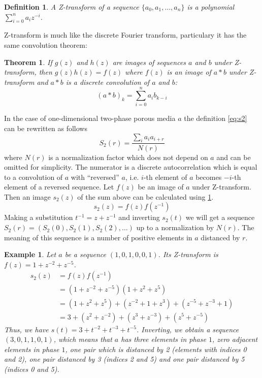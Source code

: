 \documentclass[12pt, a4paper]{article}
\newtheorem{definition}{Definition}
\newtheorem{example}{Example}
\newtheorem{theorem}{Theorem}
\begin{document}
\begin{definition}
  A Z-transform of a sequence $\{a_0, a_1, \dots, a_n\}$ is a polynomial
  $\sum_{i=0}^n a_i z^{-i}$.
\end{definition}
Z-transform is much like the discrete Fourier transform, particulary it has the
same convolution theorem:
\begin{theorem}
  If $g(z)$ and $h(z)$ are images of sequences $a$ and $b$ under Z-transform,
  then $g(z)h(z) = f(z)$ where $f(z)$ is an image of $a*b$ under Z-transform
  and $a*b$ is a discrete convolution of $a$ and $b$:
  \begin{equation*}
    (a*b)_k = \sum_{i=0}^{n} a_i b_{k-i}
  \end{equation*}
  \label{th:conv}
\end{theorem}
In the case of one-dimensional two-phase porous media $a$ the definition
\ref{eq:s2} can be rewritten as follows
\begin{equation*}
  S_2(r) = \frac{\sum_{i}a_ia_{i+r}}{N(r)}
\end{equation*}
where $N(r)$ is a normalization factor which does not depend on $a$ and can be
omitted for simplicity. The numerator is a discrete autocorrelation which is
equal to a convolution of $a$ with ``reversed'' $a$, i.e. $i$-th element of $a$
becomes $-i$-th element of a reversed sequence. Let $f(z)$ be an image of $a$
under Z-transform. Then an image $s_2(z)$ of the sum above can be calculated
using \cref{th:conv}.
\begin{equation}
  s_2(z) = f(z)f(z^{-1})
  \label{eq:s2z}
\end{equation}
Making a substitution $t^{-1} = z + z^{-1}$ and inverting $s_2(t)$ we will get a
sequence $S_2(r) = (S_2(0), S_2(1), S_2(2), \dots)$ up to a normalization by
$N(r)$. The meaning of this sequence is a number of positive elements in $a$
distanced by $r$.
\begin{example}
  Let $a$ be a sequence $(1, 0, 1, 0, 0, 1)$. Its Z-transform is
  $f(z) = 1 + z^{-2} + z^{-5}$.
  \begin{align*}
    s_2(z) &= f(z)f(z^{-1}) \\
    &= (1 + z^{-2} + z^{-5})(1 + z^2 + z^5) \\
    &= (1 + z^2 + z^5) + (z^{-2} + 1 + z^3) + (z^{-5} + z^{-3} + 1) \\
    &= 3 + (z^2 + z^{-2}) + (z^3 + z^{-3}) + (z^5 + z^{-5})
  \end{align*}
  Thus, we have $s(t) = 3 + t^{-2} + t^{-3} + t^{-5}$. Inverting, we obtain a
  sequence $(3, 0, 1, 1, 0, 1)$, which means that $a$ has three elements in
  phase $1$, zero adjacent elements in phase $1$, one pair which is distanced by
  2 (elements with indices 0 and 2), one pair distanced by 3 (indices 2 and 5)
  and one pair distanced by 5 (indices 0 and 5).
\end{example}
\end{document}
